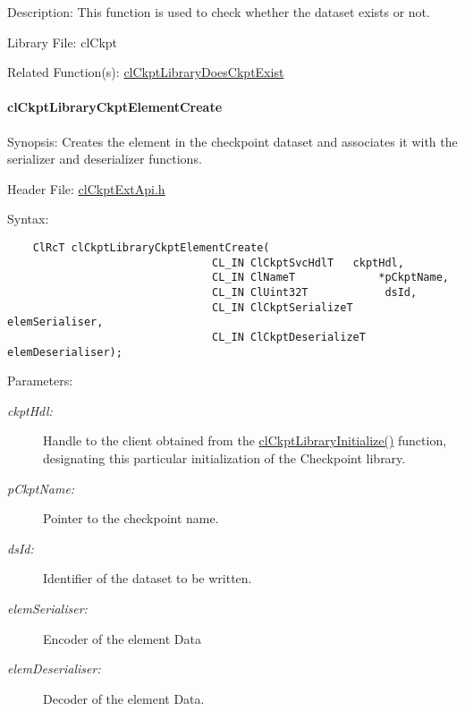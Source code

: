 \begin{Desc}
\item[Description:]This function is used to check whether the dataset exists or not.\end{Desc}
\begin{Desc}
\item[Library File:]cl\-Ckpt\end{Desc}
\begin{Desc}
\item[Related Function(s):]\hyperlink{group__group10}{cl\-Ckpt\-Library\-Does\-Ckpt\-Exist} \end{Desc}
\hypertarget{pageckpt211}{}\paragraph{cl\-Ckpt\-Library\-Ckpt\-Element\-Create}\label{pageckpt211}
\begin{Desc}
\item[Synopsis:]Creates the element in the checkpoint dataset and associates it with the serializer and deserializer functions.\end{Desc}
\begin{Desc}
\item[Header File:]\hyperlink{cl_ckpt_ext_api_8h}{cl\-Ckpt\-Ext\-Api.h}\end{Desc}
\begin{Desc}
\item[Syntax:]

\footnotesize\begin{verbatim}    ClRcT clCkptLibraryCkptElementCreate(
                                CL_IN ClCkptSvcHdlT   ckptHdl,
                                CL_IN ClNameT             *pCkptName,
                                CL_IN ClUint32T            dsId,
                                CL_IN ClCkptSerializeT     elemSerialiser,
                                CL_IN ClCkptDeserializeT   elemDeserialiser);
\end{verbatim}
\normalsize
\end{Desc}
\begin{Desc}
\item[Parameters:]
\begin{description}
\item[{\em ckpt\-Hdl:}]Handle to the client obtained from the \hyperlink{group__group10_ga2}{cl\-Ckpt\-Library\-Initialize()} function, designating this particular initialization of the Checkpoint library. \item[{\em p\-Ckpt\-Name:}]Pointer to the checkpoint name. \item[{\em ds\-Id:}]Identifier of the dataset to be written. \item[{\em elem\-Serialiser:}]Encoder of the element Data \item[{\em elem\-Deserialiser:}]Decoder of the element Data.\end{description}
\end{Desc}
